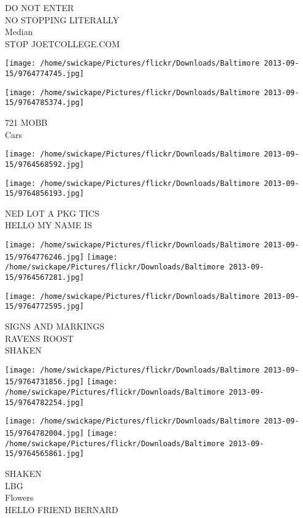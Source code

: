 \documentclass[10pt,letterpaper]{article}
\begin{document}
DO NOT ENTER\\
NO STOPPING LITERALLY\\
Median\\
STOP JOETCOLLEGE.COM
\pagebreak

\texttt{[image: /home/swickape/Pictures/flickr/Downloads/Baltimore 2013-09-15/9764774745.jpg]}

\vspace{0.25in}
\texttt{[image: /home/swickape/Pictures/flickr/Downloads/Baltimore 2013-09-15/9764785374.jpg]}

721 MOBB\\
Cars
\pagebreak

\texttt{[image: /home/swickape/Pictures/flickr/Downloads/Baltimore 2013-09-15/9764568592.jpg]}

\vspace{0.25in}
\texttt{[image: /home/swickape/Pictures/flickr/Downloads/Baltimore 2013-09-15/9764856193.jpg]}

NED LOT A PKG TICS\\
HELLO MY NAME IS
\pagebreak

\texttt{[image: /home/swickape/Pictures/flickr/Downloads/Baltimore 2013-09-15/9764776246.jpg]}
\texttt{[image: /home/swickape/Pictures/flickr/Downloads/Baltimore 2013-09-15/9764567281.jpg]}

\vspace{0.25in}
\texttt{[image: /home/swickape/Pictures/flickr/Downloads/Baltimore 2013-09-15/9764772595.jpg]}

SIGNS AND MARKINGS\\
RAVENS ROOST\\
SHAKEN
\pagebreak

\texttt{[image: /home/swickape/Pictures/flickr/Downloads/Baltimore 2013-09-15/9764731856.jpg]}
\texttt{[image: /home/swickape/Pictures/flickr/Downloads/Baltimore 2013-09-15/9764782254.jpg]}

\texttt{[image: /home/swickape/Pictures/flickr/Downloads/Baltimore 2013-09-15/9764782004.jpg]}
\texttt{[image: /home/swickape/Pictures/flickr/Downloads/Baltimore 2013-09-15/9764565861.jpg]}

SHAKEN\\
LBG\\
Flowers\\
HELLO FRIEND BERNARD
\pagebreak
\end{document}
